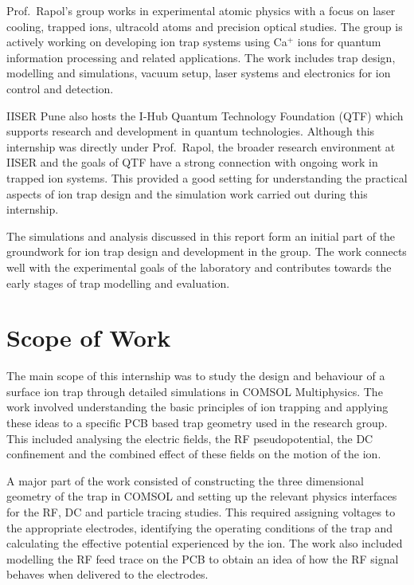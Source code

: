 \documentclass[12pt,a4paper]{report}
\begin{document}
Prof.\ Rapol’s group works in experimental atomic physics with a focus on laser cooling, trapped ions, ultracold atoms and precision optical studies. The group is actively working on developing ion trap systems using Ca$^{+}$ ions for quantum information processing and related applications. The work includes trap design, modelling and simulations, vacuum setup, laser systems and electronics for ion control and detection.

IISER Pune also hosts the I-Hub Quantum Technology Foundation (QTF) which supports research and development in quantum technologies. Although this internship was directly under Prof.\ Rapol, the broader research environment at IISER and the goals of QTF have a strong connection with ongoing work in trapped ion systems. This provided a good setting for understanding the practical aspects of ion trap design and the simulation work carried out during this internship.

The simulations and analysis discussed in this report form an initial part of the groundwork for ion trap design and development in the group. The work connects well with the experimental goals of the laboratory and contributes towards the early stages of trap modelling and evaluation.

\chapter*{Scope of Work}

The main scope of this internship was to study the design and behaviour of a surface ion trap through detailed simulations in COMSOL Multiphysics. The work involved understanding the basic principles of ion trapping and applying these ideas to a specific PCB based trap geometry used in the research group. This included analysing the electric fields, the RF pseudopotential, the DC confinement and the combined effect of these fields on the motion of the ion.

A major part of the work consisted of constructing the three dimensional geometry of the trap in COMSOL and setting up the relevant physics interfaces for the RF, DC and particle tracing studies. This required assigning voltages to the appropriate electrodes, identifying the operating conditions of the trap and calculating the effective potential experienced by the ion. The work also included modelling the RF feed trace on the PCB to obtain an idea of how the RF signal behaves when delivered to the electrodes.
\end{document}
